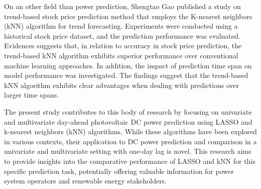 On an other field than power prediction, Shengtao Gao \cite{atlantis125995001} published a study on trend-based stock price prediction method that employs the K-nearest neighbors (kNN) algorithm for trend forecasting. Experiments were conducted using a historical stock price dataset, and the prediction performance was evaluated. Evidences suggests that, in relation to accuracy in stock price prediction, the trend-based kNN algorithm exhibits superior performance over conventional machine learning approaches. In addition, the impact of prediction time span on model performance was investigated. The findings suggest that the trend-based kNN algorithm exhibits clear advantages when dealing with predictions over larger time spans.

The present study contributes to this body of research by focusing on univariate and multivariate day-ahead photovoltaic DC power prediction using LASSO and k-nearest neighbors (kNN) algorithms. While these algorithms have been explored in various contexts, their application to DC power prediction and comparison in a univariate and multivariate setting with one-day lag is novel. This research aims to provide insights into the comparative performance of LASSO and kNN for this specific prediction task, potentially offering valuable information for power system operators and renewable energy stakeholders.
